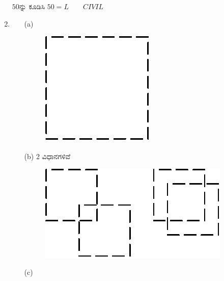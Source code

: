 \begin{enumerate}
$50$ನ್ನು ಕೂಡಿಸಿ $50 = L\qquad CIVIL$

\item
\begin{itemize}
\item[(a)] 
~

\begin{figure}[H]
\centering
\includegraphics{images/chap6/ans9a.eps}
\end{figure}

\item[(b)] 2 ವಿಧಾನಗಳಿವೆ 
~

\begin{figure}[H]
\centering
\includegraphics{images/chap6/ans9b.eps}
\end{figure}

\item[(c)]
~


\end{itemize}
\end{enumerate}
